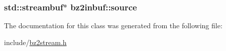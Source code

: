 \subsubsection[{source}]{\setlength{\rightskip}{0pt plus 5cm}std\+::streambuf$\ast$ bz2inbuf\+::source\hspace{0.3cm}{\ttfamily [protected]}}\label{classbz2inbuf_aa138660fd1e7505a1af60ce10064ef93}


The documentation for this class was generated from the following file\+:\begin{DoxyCompactItemize}
\item 
include/\hyperlink{bz2stream_8h}{bz2stream.\+h}\end{DoxyCompactItemize}
